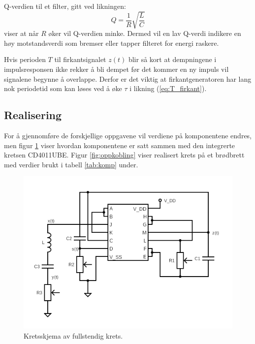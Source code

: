 \documentclass[a4paper,11pt,norsk]{article}
\begin{document}
Q-verdien til et filter, gitt ved likningen:
\begin{equation}
    Q = \frac{1}{R}\sqrt{\frac{L}{C}}
\end{equation}
viser at når $R$ øker vil Q-verdien minke. Dermed vil en lav Q-verdi indikere en høy motstandsverdi som bremser eller tapper filteret for energi raskere. 

Hvis perioden $T$ til firkantsignalet $z(t)$ blir så kort at dempningene i impulsresponsen ikke rekker å bli dempet før det kommer en ny impuls vil signalene begynne å overlappe. Derfor er det viktig at firkantgeneratoren har lang nok periodetid som kan løses ved å øke $\tau$ i likning (\ref{eq:T_firkant}).

\subsection{Realisering}
\label{realisering}

For å gjennomføre de forskjellige oppgavene vil verdiene på komponentene endres, men figur \ref{fig:kretsskjema_utenverdier} viser hvordan komponentene er satt sammen med den integrerte kretsen CD4011UBE. Figur \ref{fig:oppkobling} viser realisert krets på et brødbrett med verdier brukt i tabell \ref{tab:komp} under.  
\begin{figure}
    \centering
    \includegraphics[scale=0.7]{D1/Images/circuitWithoutValues.png}
    \caption{Kretsskjema av fullstendig krets.}
    \label{fig:kretsskjema_utenverdier}
\end{figure}
\end{document}
